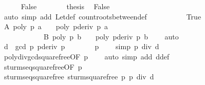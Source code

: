 \begin{isabellebody}
\ \ \ \ \isamarkupfalse%
\ False\isanewline
\ \ \ \ \ \ \isamarkupfalse%
\ {\isacharquery}thesis\ \isamarkupfalse%
\ False{}\ \isanewline
\ \ \ \ \ \ \ \ \ \ \isamarkupfalse%
\ {\isacharparenleft}auto\ simp\ add{\isacharcolon}\ Let{\isacharunderscore}def\ count{\isacharunderscore}roots{\isacharunderscore}between{\isacharunderscore}def{\isacharparenright}\isanewline
\ \ \ \ \isamarkupfalse%
\isanewline
\ \ \ \ \isamarkupfalse%
\ True\isanewline
\ \ \ \ \ \ \isamarkupfalse%
\ A{\isacharcolon}\ {\isachardoublequoteopen}poly\ p\ a\ {\isasymnoteq}\ {}\ {\isasymor}\ poly\ {\isacharparenleft}pderiv\ p{\isacharparenright}\ a\ {\isasymnoteq}\ {}{\isachardoublequoteclose}\ \ \isanewline
\ \ \ \ \ \ \ \ \ \ \ \ B{\isacharcolon}\ {\isachardoublequoteopen}poly\ p\ b\ {\isasymnoteq}\ {}\ {\isasymor}\ poly\ {\isacharparenleft}pderiv\ p{\isacharparenright}\ b\ {\isasymnoteq}\ {}{\isachardoublequoteclose}\ \isamarkupfalse%
\ auto\isanewline
\ \ \ \ \ \ \isamarkupfalse%
\ d\ {\isasymequiv}\ {\isachardoublequoteopen}gcd\ p\ {\isacharparenleft}pderiv\ p{\isacharparenright}{\isachardoublequoteclose}\isanewline
\ \ \ \ \ \ \isamarkupfalse%
\ {\isacharbackquoteopen}p\ {\isasymnoteq}\ {}{\isacharbackquoteclose}\ \isamarkupfalse%
\ {\isacharbrackleft}simp{\isacharbrackright}{\isacharcolon}\ {\isachardoublequoteopen}p\ div\ d\ {\isasymnoteq}\ {}{\isachardoublequoteclose}\ \isanewline
\ \ \ \ \ \ \ \ \ \ \isamarkupfalse%
\ poly{\isacharunderscore}div{\isacharunderscore}gcd{\isacharunderscore}squarefree{\isacharparenleft}{}{\isacharparenright}{\isacharbrackleft}OF\ {\isacharbackquoteopen}p\ {\isasymnoteq}\ {}{\isacharbackquoteclose}{\isacharbrackright}\ \isamarkupfalse%
\ {\isacharparenleft}auto\ simp\ add{\isacharcolon}\ d{\isacharunderscore}def{\isacharparenright}\isanewline
\ \ \ \ \ \ \isamarkupfalse%
\ sturm{\isacharunderscore}seq{\isacharunderscore}squarefree{\isacharprime}{\isacharbrackleft}OF\ {\isacharbackquoteopen}p\ {\isasymnoteq}\ {}{\isacharbackquoteclose}{\isacharbrackright}\isanewline
\ \ \ \ \ \ \ \ \ \ \isamarkupfalse%
\ sturm{\isacharunderscore}seq{\isacharunderscore}squarefree\ {\isachardoublequoteopen}sturm{\isacharunderscore}squarefree{\isacharprime}\ p{\isachardoublequoteclose}\ {\isachardoublequoteopen}p\ div\ d{\isachardoublequoteclose}\isanewline

\end{isabellebody}

